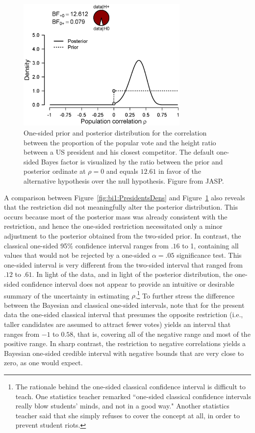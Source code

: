 \begin{figure}[tbh]
    \begin{center}
        \includegraphics[width=0.75\textwidth]{figs/bi1_PresidentsDensPos.eps}
        \caption{One-sided prior and posterior distribution for the correlation between the proportion of the popular vote and the height ratio between a US president and his closest competitor. The default one-sided Bayes factor is visualized by the ratio between the prior and posterior ordinate at $\rho = 0$ and equals $12.61$ in favor of the alternative hypothesis over the null hypothesis. Figure from JASP.}\label{fig:bi1:PresidentsDensPos}
    \end{center}
\end{figure}

A comparison between Figure~\ref{fig:bi1:PresidentsDens} and Figure~\ref{fig:bi1:PresidentsDensPos} also reveals that the restriction did not meaningfully alter the posterior distribution. This occurs because most of the posterior mass was already consistent with the restriction, and hence the one-sided restriction necessitated only a minor adjustment to the posterior obtained from the two-sided prior. In contrast, the classical one-sided 95\% confidence interval ranges from $.16$ to 1, containing all values that would not be rejected by a one-sided $\alpha=.05$ significance test. This one-sided interval is very different from the two-sided interval that ranged from $.12$ to $.61$. In light of the data, and in light of the posterior distribution, the one-sided confidence interval does not appear to provide an intuitive or desirable summary of the uncertainty in estimating $\rho$.\footnote{The rationale behind the one-sided classical confidence interval is difficult to teach. One statistics teacher remarked ``one-sided classical confidence intervals really blow students' minds, and not in a good way." Another statistics teacher said that she simply refuses to cover the concept at all, in order to prevent student riots.} To further stress the difference between the Bayesian and classical one-sided intervals, note that for the present data the one-sided classical interval that presumes the opposite restriction (i.e., taller candidates are assumed to attract fewer votes) yields an interval that ranges from $-1$ to $0.58$, that is, covering all of the negative range and most of the positive range. In sharp contrast, the restriction to negative correlations yields a Bayesian one-sided credible interval with negative bounds that are very close to zero, as one would expect.

